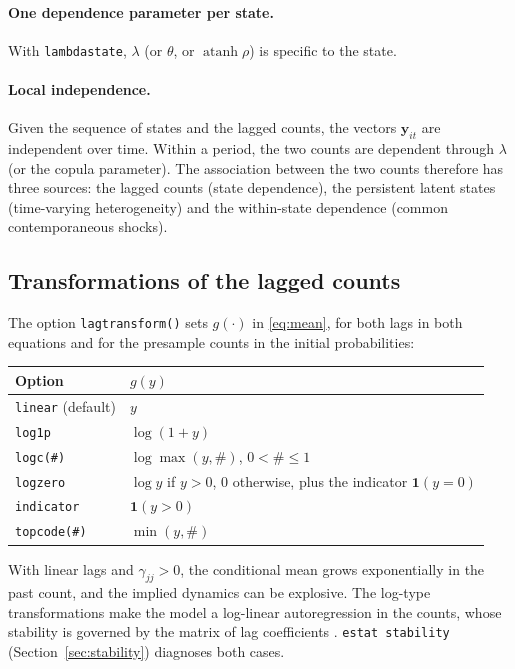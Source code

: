\documentclass[11pt,a4paper]{article}
\newcommand{\cmd}[1]{\texttt{#1}}
\newcommand{\yv}{\mathbf y}
\begin{document}
\paragraph{One dependence parameter per state.} With \cmd{lambdastate}, $\lambda$ (or $\theta$, or
$\operatorname{atanh}\rho$) is specific to the state.

\paragraph{Local independence.} Given the sequence of states and the lagged counts, the vectors
$\yv_{it}$ are independent over time. Within a period, the two counts are dependent through
$\lambda$ (or the copula parameter). The association between the two counts therefore has three
sources: the lagged counts (state dependence), the persistent latent states (time-varying
heterogeneity) and the within-state dependence (common contemporaneous shocks).

\subsection{Transformations of the lagged counts}\label{sec:lags}

The option \cmd{lagtransform()} sets $g(\cdot)$ in \eqref{eq:mean}, for both lags in both equations
and for the presample counts in the initial probabilities:

\begin{center}
\begin{tabular}{ll}
\toprule
Option & $g(y)$\\
\midrule
\cmd{linear} (default) & $y$\\
\cmd{log1p} & $\log(1+y)$\\
\cmd{logc(\#)} & $\log\max(y,\#)$, $0<\#\le1$\\
\cmd{logzero} & $\log y$ if $y>0$, $0$ otherwise, plus the indicator $\mathbf 1(y=0)$\\
\cmd{indicator} & $\mathbf 1(y>0)$\\
\cmd{topcode(\#)} & $\min(y,\#)$\\
\bottomrule
\end{tabular}
\end{center}

With linear lags and $\gamma_{jj}>0$, the conditional mean grows exponentially in the past count, and
the implied dynamics can be explosive. The log-type transformations make the model a log-linear
autoregression in the counts, whose stability is governed by the matrix of lag coefficients
\citep[see][]{blundell2002}. \cmd{estat stability} (Section~\ref{sec:stability}) diagnoses both
cases.
\end{document}
